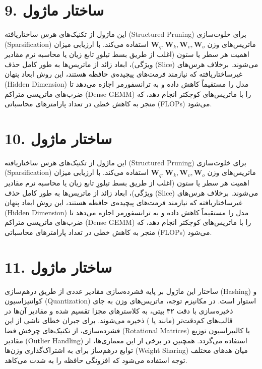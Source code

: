 \documentclass[12pt,a4paper]{report}
\begin{document}
\section*{9. ساختار ماژول }
این ماژول از تکنیک‌های هرس ساختاریافته (Structured Pruning) برای خلوت‌سازی (Sparsification) ماتریس‌های وزن $\mathbf{W}_q, \mathbf{W}_k, \mathbf{W}_v, \mathbf{W}_o$ استفاده می‌کند. با ارزیابی میزان اهمیت هر سطر یا ستون (اغلب از طریق بسط تیلورِ تابع زیان یا محاسبه نرم مقادیر ویژگی)، ابعاد زائد از ماتریس‌ها به طور کامل حذف (Slice) می‌شوند. برخلاف هرس‌های غیرساختاریافته که نیازمند فرمت‌های پیچیده‌ی حافظه هستند، این روش ابعاد پنهان (Hidden Dimension) مدل را مستقیماً کاهش داده و به ترانسفورمر اجازه می‌دهد تا ضرب‌های ماتریسی متراکم (Dense GEMM) را با ماتریس‌های کوچکتر انجام دهد، که منجر به کاهش خطی در تعداد پارامترهای محاسباتی (FLOPs) می‌شود.

\section*{10. ساختار ماژول }
این ماژول از تکنیک‌های هرس ساختاریافته (Structured Pruning) برای خلوت‌سازی (Sparsification) ماتریس‌های وزن $\mathbf{W}_q, \mathbf{W}_k, \mathbf{W}_v, \mathbf{W}_o$ استفاده می‌کند. با ارزیابی میزان اهمیت هر سطر یا ستون (اغلب از طریق بسط تیلورِ تابع زیان یا محاسبه نرم مقادیر ویژگی)، ابعاد زائد از ماتریس‌ها به طور کامل حذف (Slice) می‌شوند. برخلاف هرس‌های غیرساختاریافته که نیازمند فرمت‌های پیچیده‌ی حافظه هستند، این روش ابعاد پنهان (Hidden Dimension) مدل را مستقیماً کاهش داده و به ترانسفورمر اجازه می‌دهد تا ضرب‌های ماتریسی متراکم (Dense GEMM) را با ماتریس‌های کوچکتر انجام دهد، که منجر به کاهش خطی در تعداد پارامترهای محاسباتی (FLOPs) می‌شود.

\section*{11. ساختار ماژول }
ساختار این ماژول بر پایه فشرده‌سازی مقادیر عددی از طریق درهم‌سازی (Hashing) و کوانتیزاسیون (Quantization) استوار است. در مکانیزم توجه، ماتریس‌های وزن به جای ذخیره‌سازی با دقت ۳۲ بیتی، به کلاسترهای مجزا تقسیم شده و مقادیر آن‌ها در قالب‌های کم‌دقت‌تر (مانند  یا ) ذخیره می‌شوند. برای جبران خطای ناشی از این فشرده‌سازی، از تکنیک‌های چرخش فضا (Rotational Matrices) یا کالیبراسیون توزیع مقادیر (Outlier Handling) استفاده می‌گردد. همچنین در برخی از این معماری‌ها، از توابع درهم‌ساز برای به اشتراک‌گذاری وزن‌ها (Weight Sharing) میان هد‌های مختلف توجه استفاده می‌شود که افزونگی حافظه را به شدت می‌کاهد.
\end{document}
